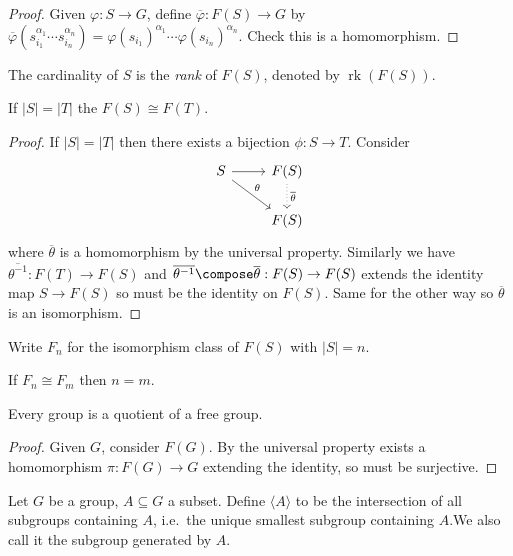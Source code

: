 \documentclass[a4paper]{article}
\begin{document}
\begin{proof}
  Given \(\varphi: S \to G\), define \(\overline \varphi: F(S) \to G\) by \(\overline \varphi(s_{i_1}^{\alpha_1} \cdots s_{i_n}^{\alpha_n}) = \varphi(s_{i_1})^{\alpha_1} \cdots \varphi(s_{i_n})^{\alpha_n}\). Check this is a homomorphism.
\end{proof}

\begin{definition}[rank]
  The cardinality of \(S\) is the \emph{rank} of \(F(S)\), denoted by \(\operatorname{rk}(F(S))\).
\end{definition}

\begin{corollary}
  If \(|S| = |T|\) the \(F(S) \cong F(T)\).
\end{corollary}

\begin{proof}
  If \(|S| = |T|\) then there exists a bijection \(\phi: S \to T\). Consider
  \[
    \begin{tikzcd}
      S \ar[r] \ar[dr, "\theta"] & F(S) \ar[d, dotted, "\overline \theta"] \\
      & F(S)
\end{tikzcd}
  \]
  where \(\overline \theta\) is a homomorphism by the universal property. Similarly we have \(\overline{\theta^{-1}}: F(T) \to F(S)\) and \(\overline{\theta^{-1}} \compose \overline \theta: F(S) \to F(S)\) extends the identity map \(S \to F(S)\) so must be the identity on \(F(S)\). Same for the other way so \(\overline \theta\) is an isomorphism.
\end{proof}

\begin{notation}
  Write \(F_n\) for the isomorphism class of \(F(S)\) with \(|S| = n\).
\end{notation}

\begin{ex}
  If \(F_n \cong F_m\) then \(n = m\).
\end{ex}

\begin{corollary}
  Every group is a quotient of a free group.
\end{corollary}

\begin{proof}
  Given \(G\), consider \(F(G)\). By the universal property exists a homomorphism \(\pi: F(G) \to G\) extending the identity, so must be surjective.
\end{proof}

\begin{definition}
  Let \(G\) be a group, \(A \subseteq G\) a subset. Define \(\langle A\rangle\) to be the intersection of all subgroups containing \(A\), i.e.\ the unique smallest subgroup containing \(A\).We also call it the subgroup generated by \(A\).
\end{definition}
\end{document}
